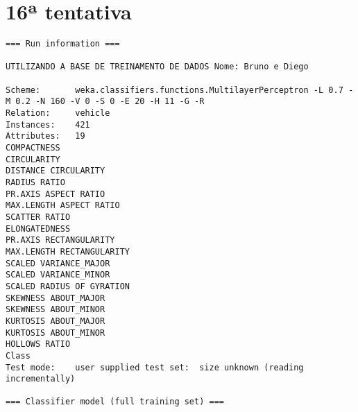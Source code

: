 \documentclass[
	article,			%
	11pt,				%
	oneside,			%
	a4paper,			%
	english,			%
	brazil,				%
	sumario=tradicional
	]{abntex2}
\begin{document}
\section{16ª tentativa}

\begin{lstlisting}
=== Run information ===

UTILIZANDO A BASE DE TREINAMENTO DE DADOS Nome: Bruno e Diego

Scheme:       weka.classifiers.functions.MultilayerPerceptron -L 0.7 -M 0.2 -N 160 -V 0 -S 0 -E 20 -H 11 -G -R
Relation:     vehicle
Instances:    421
Attributes:   19
COMPACTNESS
CIRCULARITY
DISTANCE CIRCULARITY
RADIUS RATIO
PR.AXIS ASPECT RATIO
MAX.LENGTH ASPECT RATIO
SCATTER RATIO
ELONGATEDNESS
PR.AXIS RECTANGULARITY
MAX.LENGTH RECTANGULARITY
SCALED VARIANCE_MAJOR
SCALED VARIANCE_MINOR
SCALED RADIUS OF GYRATION
SKEWNESS ABOUT_MAJOR
SKEWNESS ABOUT_MINOR
KURTOSIS ABOUT_MAJOR
KURTOSIS ABOUT_MINOR
HOLLOWS RATIO
Class
Test mode:    user supplied test set:  size unknown (reading incrementally)

=== Classifier model (full training set) ===


\end{lstlisting}
\end{document}
